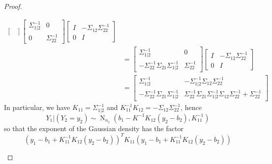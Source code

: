 \documentclass[12pt,a4paper]{amsart}
\newcommand{\gaussian}[3]{\operatorname{N}_{#1}\left(#2,#3\right)}
\theoremstyle{plain}%
\theoremstyle{definition}
\theoremstyle{remark}
\begin{document}
\begin{proof}
\begin{enumerate}
\begin{align*}
\begin{bmatrix}
  \end{bmatrix}
  \begin{bmatrix}
    \Sigma_{1|2}^{-1} & 0 \\ 0 & \Sigma_{22}^{-1}
  \end{bmatrix}
  \begin{bmatrix}
    I & - \Sigma_{12} \Sigma_{22}^{-1} \\ 0 & I
  \end{bmatrix}
\\ &=
  \begin{bmatrix}
    \Sigma_{1|2}^{-1} & 0 \\ - \Sigma_{22}^{-1} \Sigma_{21} \Sigma_{1|2}^{-1} & \Sigma_{22}^{-1}
  \end{bmatrix}
  \begin{bmatrix}
    I & - \Sigma_{12} \Sigma_{22}^{-1} \\ 0 & I
  \end{bmatrix}
\\ &=
\begin{bmatrix}
  \Sigma_{1|2}^{-1} & - \Sigma_{1|2}^{-1} \Sigma_{12} \Sigma_{22}^{-1} \\ - \Sigma_{22}^{-1} \Sigma_{21} \Sigma_{1|2}^{-1} & \Sigma_{22}^{-1} \Sigma_{21} \Sigma_{1|2}^{-1} \Sigma_{12} \Sigma_{22}^{-1} + \Sigma_{22}^{-1}
\end{bmatrix}
\end{align*}
%
In particular, we have $K_{11} = \Sigma_{1|2}^{-1}$ and $K_{11}^{-1}K_{12} = - \Sigma_{12}\Sigma_{22}^{-1}$, hence
%
\begin{equation*}
  Y_1|(Y_2 = y_2) \sim \gaussian {n_1} {b_1 - K^{-1}K_{12}(y_2-b_2)}{K_{11}^{-1}}
\end{equation*}
%
so that the exponent of the Gaussian density has the factor
%
\begin{equation*}
  (y_1 - b_1 + K_{11}^{-1}K_{12}(y_2-b_2))^TK_{11}(y_1 - b_1 + K_{11}^{-1}K_{12}(y_2-b_2))
\end{equation*}
\end{enumerate}
\end{proof}
\end{document}
